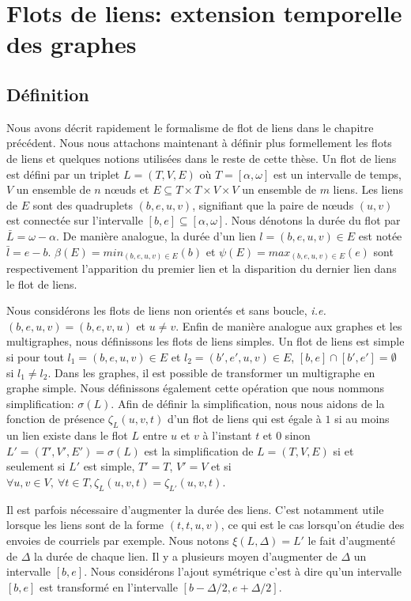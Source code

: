 \chapter{Flots de liens: extension temporelle des graphes}
\minitoc
\label{chap:def_flot}

\section{Définition}
\label{sec:definition}

Nous avons décrit rapidement le formalisme de flot de liens dans le chapitre précédent.
Nous nous attachons maintenant à définir plus formellement les flots de liens et quelques notions utilisées dans le reste de cette thèse.
Un flot de liens est défini par un triplet $L=(T,V,E)$ où $T=[\alpha, \omega]$ est un intervalle de temps, $V$ un ensemble de $n$ n\oe uds et $E\subseteq T\times T \times V \times V$ un ensemble de $m$ liens.
Les liens de $E$ sont des quadruplets $(b,e,u,v)$, signifiant que la paire de n\oe uds $(u, v)$ est connectée sur l'intervalle $[b,e] \subseteq [\alpha,\omega]$.
Nous dénotons la durée du flot par $\bar{L}=\omega-\alpha$.
De manière analogue, la durée d'un lien $l=(b,e,u,v) \in E$ est notée   $\bar{l}=e-b$.
$\beta(E)= min_{(b,e,u,v) \in E} (b)$ et $\psi(E)= max_{(b,e,u,v) \in E} (e)$ sont respectivement l'apparition du premier lien et la disparition du dernier lien dans le flot de liens.

Nous considérons les flots de liens non orientés et sans boucle, \emph{i.e.}$(b,e,u,v)=(b,e,v,u)$ et $u \neq v$.
Enfin de manière analogue aux graphes et les multigraphes, nous définissons les flots de liens simples.
Un flot de liens est simple si pour tout $l_1=(b,e,u,v) \in E$ et $l_2=(b',e',u, v) \in E$, $[b,e]\cap [b', e'] = \emptyset$ si $l_1 \neq l_2$.
Dans les graphes, il est possible de transformer un multigraphe en graphe simple.
Nous définissons également cette opération que nous nommons simplification: $\sigma(L)$.
Afin de définir la simplification, nous nous aidons de la fonction de présence $\zeta_{L}(u,v,t)$ d'un flot de liens qui est égale à $1$ si au moins un lien existe dans le flot $L$ entre $u$ et $v$ à l'instant $t$ et $0$ sinon
$L'=(T',V',E')= \sigma(L)$ est la simplification de $L=(T,V,E)$ si et seulement si $L'$ est simple, $T'=T$, $V'=V$ et si $\forall u,v \in V,\ \forall t\in T, \zeta_{L}(u,v,t)= \zeta_{L'}(u,v,t)$.

Il est parfois nécessaire d'augmenter la durée des liens.
C'est notamment utile lorsque les liens sont de la forme $(t,t,u,v)$, ce qui est le cas lorsqu'on étudie des envoies de courriels par exemple.
Nous notons $\xi(L,\Delta)=L'$ le fait d'augmenté de $\Delta$ la durée de chaque lien.
Il y a plusieurs moyen d'augmenter de $\Delta$ un intervalle $[b,e]$.
Nous considérons l'ajout symétrique c'est à dire qu'un intervalle $[b,e]$ est transformé en l'intervalle $[b-\Delta/2,e+\Delta/2]$.

